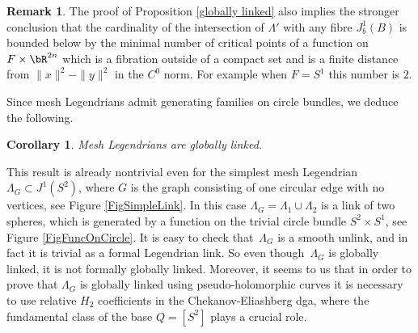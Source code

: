\documentclass[JEP,XML,SOM,Unicode,NoFloatCountersInSection]{cedram}
\theoremstyle{plain}
\newtheorem{corollary}[theorem]{Corollary}
\theoremstyle{definition}
\newtheorem{remark}[theorem]{Remark}
\begin{document}
\begin{remark}
The proof of Proposition \ref{globally linked} also implies the stronger conclusion that the cardinality of the intersection of $\Lambda'$ with any fibre $J^1_b(B)$ is bounded below by the minimal number of critical points of a function on $F \times \bR^{2n}$ which is a fibration outside of a compact set and is a finite distance from $\|x\|^2-\|y\|^2$ in the $C^0$ norm. For example when $F=S^1$ this number is $2$.
\end{remark}

Since mesh Legendrians admit generating families on circle bundles, we deduce the following.

\begin{corollary}\label{corollary: mesh Legendrians are globally linked}
Mesh Legendrians are globally linked.
\end{corollary}

This result is already nontrivial even for the simplest mesh Legendrian $\Lambda_G \subset J^1(S^2)$, where $G$ is the graph consisting of one circular edge with no vertices, see Figure \ref{FigSimpleLink}. In this case $\Lambda_G= \Lambda_1 \cup \Lambda_2$ is a link of two spheres, which is generated by a function on the trivial circle bundle $S^2 \times S^1$, see Figure \ref{FigFuncOnCircle}. It is easy to check that~$\Lambda_G$ is a smooth unlink, and in fact it is trivial as a formal Legendrian link. So even though~$\Lambda_G$ is globally linked, it is not formally globally linked. Moreover, it seems to us that in order to prove that $\Lambda_G$ is globally linked using pseudo-holomorphic curves it is necessary to use relative $H_2$ coefficients in the Chekanov-Eliashberg dga, where the fundamental class of the base $Q=[S^2]$ plays a crucial role.
\end{document}
